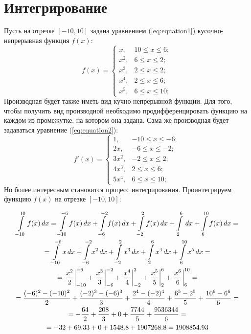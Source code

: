 \documentclass[11pt,a4paper]{article}
\begin{document}
	\section{Интегрирование}
	Пусть на отрезке $[-10,10]$ задана уравнением (\ref{eq:equation1})  кусочно-непрерывная функция $f(x)$:
	\begin{equation}
	f(x) = 
	\begin{cases}
	x, & 10 \leqslant x \leqslant 6; \\
	x^2, &  6 \leqslant x \leqslant 2; \\
	x^3, & 2 \leqslant x \leqslant 2; \\
	x^4, & 2 \leqslant x \leqslant 6; \\
	x^5, & 6 \leqslant x \leqslant 10;
	\end{cases} 
	\label{eq:equation1}
	\end{equation}
	Производная будет также иметь вид кучно-непрерывной функции. Для того, чтобы получить вид производной необходимо продифференцировать функцию на каждом из промежутке, на котором она задана. Сама же производная будет задаваться уравнение (\ref{eq:equation2}):
	\begin{equation}
	f'(x) = 
	\begin{cases}
	1, & -10 \leqslant x \leqslant -6; \\
	2x, &  -6 \leqslant x \leqslant -2; \\
	3x^2, & -2 \leqslant x \leqslant 2; \\
	4x^3, & 2 \leqslant x \leqslant 6; \\
	5x^4, & 6 \leqslant x \leqslant 10;
	\end{cases}
	\label{eq:equation2}
	\end{equation}	
	Но более интересным становится процесс интегрирования. Проинтегрируем функцию $f(x)$ на отрезке $[-10,10]$:
	
	

	\begin{multline}
	\int \limits_{-10}^{10} f(x)\,dx = \int \limits_{-10}^{-6} f(x)\,dx + \int \limits_{-6}^{-2} f(x)\,dx + \int \limits_{-2}^{2} f(x)\,dx + \int \limits_{2}^{6}\,dx + \int \limits_{6}^{10} f(x)\,dx =\\
	 =\int \limits_{-10}^{-6} x\,dx + \int \limits_{-6}^{-2} x^2\,dx + \int \limits_{-2}^{2} x^3\,dx + \int \limits_{2}^{6} x^4 \,dx + \int \limits_{6}^{10} x^5\,dx = \\
	= \eval{ \frac{x^2}{2} }_{-10}^{-6} + \eval{ \frac{x^3}{3} }_{-6}^{-2} + \eval{ \frac{x^4}{4} }_{-2}^{2} + \eval{ \frac{x^5}{5} }_{2}^{6} + \eval{ \frac{x^6}{6} }_{6}^{10}  = \\
 	= \frac{(-6)^2 - (-10)^2}{2} + \frac{(-2)^3 - (-6)^3}{3} + \frac{2^4 - (-2)^4}{4} + \frac{6^5 - 2^5}{5} + \frac{10^6 - 6^6}{6}  = \\
	= - \frac{64}{2} + \frac{208}{3} + 0 + \frac{7744}{5} + \frac{9536344}{6} = \\
	= -32 + 69.33 + 0 + 1548.8 + 1907268.8 = 1908854.93
	\end{multline}
\end{document}
